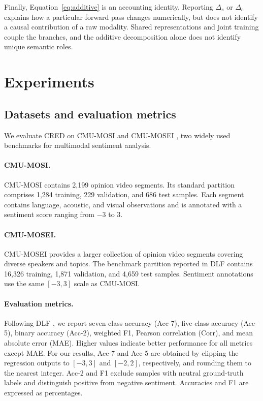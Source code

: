 \documentclass[review,12pt]{elsarticle}
\begin{document}
Finally, Equation~\eqref{eq:additive} is an accounting identity. Reporting $\Delta_s$ or $\Delta_c$ explains how a particular forward pass changes numerically, but does not identify a causal contribution of a raw modality. Shared representations and joint training couple the branches, and the additive decomposition alone does not identify unique semantic roles.

\section{Experiments}
\subsection{Datasets and evaluation metrics}
We evaluate CRED on CMU-MOSI \cite{mosi} and CMU-MOSEI \cite{mosei}, two widely used benchmarks for multimodal sentiment analysis.

\paragraph{CMU-MOSI.}
CMU-MOSI contains 2,199 opinion video segments. Its standard partition comprises 1,284 training, 229 validation, and 686 test samples. Each segment contains language, acoustic, and visual observations and is annotated with a sentiment score ranging from $-3$ to $3$.

\paragraph{CMU-MOSEI.}
CMU-MOSEI provides a larger collection of opinion video segments covering diverse speakers and topics. The benchmark partition reported in DLF \cite{dlf} contains 16,326 training, 1,871 validation, and 4,659 test samples. Sentiment annotations use the same $[-3,3]$ scale as CMU-MOSI.

\paragraph{Evaluation metrics.}
Following DLF \cite{dlf}, we report seven-class accuracy (Acc-7), five-class accuracy (Acc-5), binary accuracy (Acc-2), weighted F1, Pearson correlation (Corr), and mean absolute error (MAE). Higher values indicate better performance for all metrics except MAE. For our results, Acc-7 and Acc-5 are obtained by clipping the regression outputs to $[-3,3]$ and $[-2,2]$, respectively, and rounding them to the nearest integer. Acc-2 and F1 exclude samples with neutral ground-truth labels and distinguish positive from negative sentiment. Accuracies and F1 are expressed as percentages.
\end{document}
